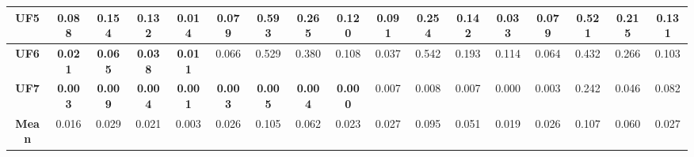 \begin{table*}[t]
{\begin{tabular}{cc|c|c|c|c|c|c|c|c|c|c|c|c|c|c|c}
\multicolumn{1}{c|}{\textbf{UF5}}   & \textbf{0.088} & \textbf{0.154} & \textbf{0.132} & \textbf{0.014} & 0.079          & 0.593          & 0.265          & 0.120          & \textbf{0.091} & \textbf{0.254} & \textbf{0.142} & \textbf{0.033} & 0.079          & 0.521          & 0.215          & 0.131          \\ \hline
\multicolumn{1}{c|}{\textbf{UF6}}   & \textbf{0.021} & \textbf{0.065} & \textbf{0.038} & \textbf{0.011} & 0.066          & 0.529          & 0.380          & 0.108          & 0.037          & 0.542          & 0.193          & 0.114          & 0.064          & 0.432          & 0.266          & 0.103          \\ \hline
\multicolumn{1}{c|}{\textbf{UF7}}   & \textbf{0.003} & \textbf{0.009} & \textbf{0.004} & \textbf{0.001} & \textbf{0.003} & \textbf{0.005} & \textbf{0.004} & \textbf{0.000} & 0.007          & 0.008          & 0.007          & 0.000          & 0.003          & 0.242          & 0.046          & 0.082          \\ \hline
\multicolumn{1}{c|}{\textbf{Mean}}  & 0.016          & 0.029          & 0.021          & 0.003          & 0.026          & 0.105          & 0.062          & 0.023          & 0.027          & 0.095          & 0.051          & 0.019          & 0.026          & 0.107          & 0.060          & 0.027          \\ \hline
\end{tabular}%
}
\end{table*}


